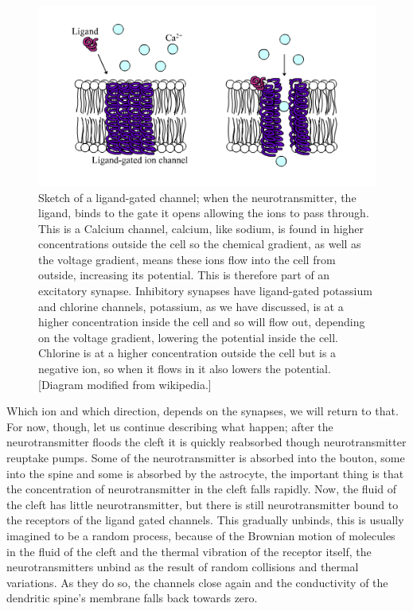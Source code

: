 \documentclass[11pt,a4paper]{scrartcl}
\begin{document}
\begin{figure}
\begin{center}
\includegraphics[width=12cm]{LGIC.png}
\end{center}
\caption{Sketch of a ligand-gated channel; when the neurotransmitter,
  the ligand, binds to the gate it opens allowing the ions to pass
  through. This is a Calcium channel, calcium, like sodium, is found
  in higher concentrations outside the cell so the chemical gradient,
  as well as the voltage gradient, means these ions flow into the cell
  from outside, increasing its potential.  This is therefore part of
  an excitatory synapse. Inhibitory synapses have ligand-gated
  potassium and chlorine channels, potassium, as we have discussed, is
  at a higher concentration inside the cell and so will flow out,
  depending on the voltage gradient, lowering the potential inside the
  cell. Chlorine is at a higher concentration outside the cell but is
  a negative ion, so when it flows in it also lowers the
  potential. [Diagram modified from wikipedia.]\label{LGIC}}
\end{figure}

Which ion and which direction, depends on the synapses, we will return
to that. For now, though, let us continue describing what happen;
after the neurotransmitter floods the cleft it is quickly reabsorbed
though neurotransmitter reuptake pumps. Some of the neurotransmitter
is absorbed into the bouton, some into the spine and some is absorbed
by the astrocyte, the important thing is that the concentration of
neurotransmitter in the cleft falls rapidly. Now, the fluid of the
cleft has little neurotransmitter, but there is still neurotransmitter
bound to the receptors of the ligand gated channels. This gradually
unbinds, this is usually imagined to be a random process, because of
the Brownian motion of molecules in the fluid of the cleft and the
thermal vibration of the receptor itself, the neurotransmitters unbind
as the result of random collisions and thermal variations. As they do
so, the channels close again and the conductivity of the dendritic
spine's membrane falls back towards zero.
\end{document}
